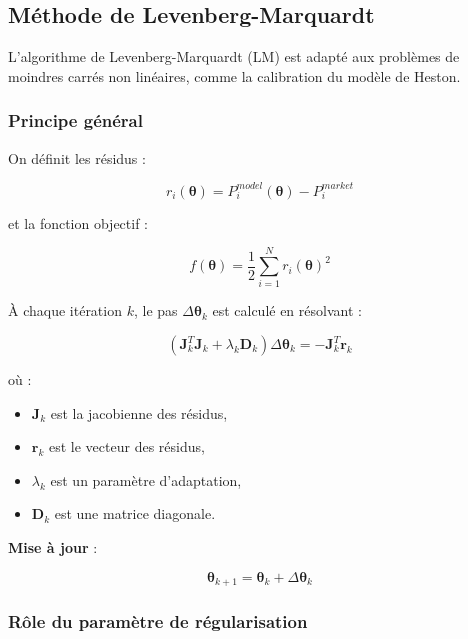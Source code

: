 \subsection{Méthode de Levenberg-Marquardt}

L'algorithme de Levenberg-Marquardt (LM) est adapté aux problèmes de moindres carrés non linéaires, comme la calibration du modèle de Heston.

\subsubsection{Principe général}

On définit les résidus :

\begin{equation}
	r_i(\boldsymbol{\theta}) = P^{model}_i(\boldsymbol{\theta}) - P^{market}_i
\end{equation}

et la fonction objectif :

\begin{equation}
	f(\boldsymbol{\theta}) = \frac{1}{2} \sum_{i=1}^{N} r_i(\boldsymbol{\theta})^2
\end{equation}

À chaque itération $k$, le pas $\Delta\boldsymbol{\theta}_k$ est calculé en résolvant :

\begin{equation}
	(\mathbf{J}_k^T\mathbf{J}_k + \lambda_k\mathbf{D}_k)\Delta\boldsymbol{\theta}_k = -\mathbf{J}_k^T\mathbf{r}_k
\end{equation}

où :
\begin{itemize}
	\item $\mathbf{J}_k$ est la jacobienne des résidus,
	\item $\mathbf{r}_k$ est le vecteur des résidus,
	\item $\lambda_k$ est un paramètre d'adaptation,
	\item $\mathbf{D}_k$ est une matrice diagonale.
\end{itemize}

\textbf{Mise à jour} :

\begin{equation}
	\boldsymbol{\theta}_{k+1} = \boldsymbol{\theta}_k + \Delta\boldsymbol{\theta}_k
\end{equation}

\subsubsection{Rôle du paramètre de régularisation}

